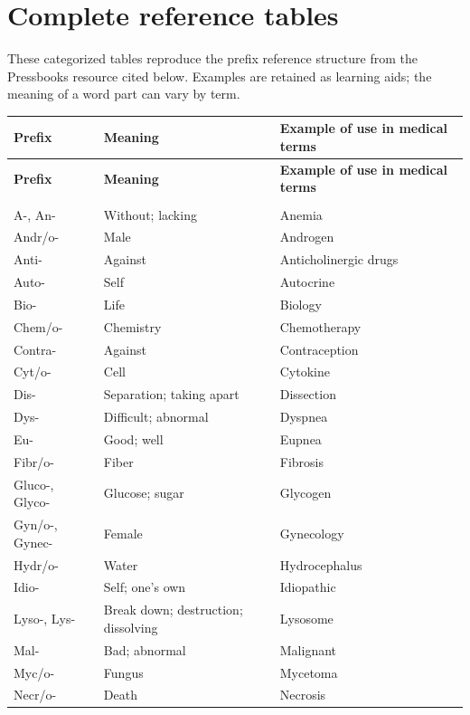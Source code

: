 \section*{Complete reference tables}
These categorized tables reproduce the prefix reference structure from the Pressbooks resource cited below. Examples are retained as learning aids; the meaning of a word part can vary by term.

\small
\setlength{\LTleft}{0pt}
\setlength{\LTright}{0pt}
\begin{longtable}{>{\raggedright\arraybackslash}p{} >{\raggedright\arraybackslash}p{} >{\raggedright\arraybackslash}p{}}
\toprule
\textbf{Prefix} & \textbf{Meaning} & \textbf{Example of use in medical terms} \\
\midrule
\endfirsthead
\toprule
\textbf{Prefix} & \textbf{Meaning} & \textbf{Example of use in medical terms} \\
\midrule
\endhead
\bottomrule
\endfoot
\multicolumn{3}{l}{\textbf{Common prefixes}} \\
A-, An- & Without; lacking & Anemia \\
Andr/o- & Male & Androgen \\
Anti- & Against & Anticholinergic drugs \\
Auto- & Self & Autocrine \\
Bio- & Life & Biology \\
Chem/o- & Chemistry & Chemotherapy \\
Contra- & Against & Contraception \\
Cyt/o- & Cell & Cytokine \\
Dis- & Separation; taking apart & Dissection \\
Dys- & Difficult; abnormal & Dyspnea \\
Eu- & Good; well & Eupnea \\
Fibr/o- & Fiber & Fibrosis \\
Gluco-, Glyco- & Glucose; sugar & Glycogen \\
Gyn/o-, Gynec- & Female & Gynecology \\
Hydr/o- & Water & Hydrocephalus \\
Idio- & Self; one's own & Idiopathic \\
Lyso-, Lys- & Break down; destruction; dissolving & Lysosome \\
Mal- & Bad; abnormal & Malignant \\
Myc/o- & Fungus & Mycetoma \\
Necr/o- & Death & Necrosis \\

\end{longtable}
